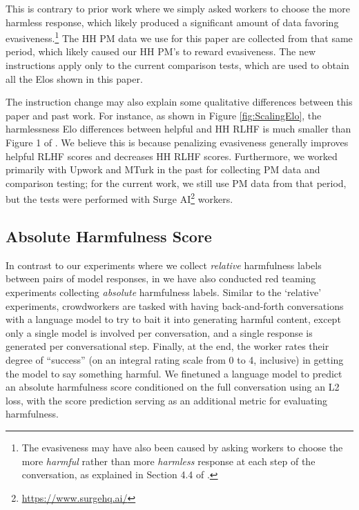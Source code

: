 This is contrary to prior work \cite{bai2022training} where we simply asked workers to choose the more harmless response, which likely produced a significant amount of data favoring evasiveness.\footnote{The evasiveness may have also been caused by asking workers to choose the more {\it harmful} rather than more {\it harmless} response at each step of the conversation, as explained in Section 4.4 of \cite{bai2022training}.} The HH PM data we use for this paper are collected from that same period, which likely caused our HH PM's to reward evasiveness. The new instructions apply only to the current comparison tests, which are used to obtain all the Elos shown in this paper. 

The instruction change may also explain some qualitative differences between this paper and past work. For instance, as shown in Figure \ref{fig:ScalingElo}, the harmlessness Elo differences between helpful and HH RLHF is much smaller than Figure 1 of \cite{bai2022training}. We believe this is because penalizing evasiveness generally improves helpful RLHF scores and decreases HH RLHF scores. Furthermore, we worked primarily with Upwork and MTurk in the past for collecting PM data and comparison testing; for the current work, we still use PM data from that period, but the  tests were performed  with Surge AI\footnote{\url{https://www.surgehq.ai/}} workers.

\subsection{Absolute Harmfulness Score}

In contrast to our experiments where we collect {\it relative} harmfulness labels between pairs of model responses, in \cite{DeepRedTeaming} we have also conducted red teaming experiments collecting {\it absolute} harmfulness labels.  Similar to the `relative' experiments, crowdworkers are tasked with having back-and-forth conversations with a language model to try to bait it into generating harmful content, except only a single model is involved per conversation, and a single response is generated per conversational step. Finally, at the end, the worker rates their degree of ``success'' (on an integral rating scale from 0 to 4, inclusive) in getting the model to say something harmful. We finetuned a language model to predict an absolute harmfulness score conditioned on the full conversation using an L2 loss, with the score prediction serving as an additional metric for evaluating harmfulness.

